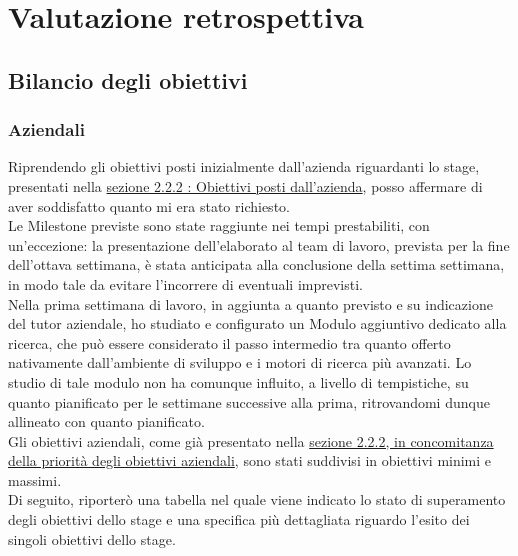 

\chapter{Valutazione retrospettiva}
\label{valutazione_retrospettiva}

\section{Bilancio degli obiettivi}

	\subsection{Aziendali}
	
	Riprendendo gli obiettivi posti inizialmente dall'azienda riguardanti lo stage, presentati nella \hyperref[sub:obiettivi_posti_azienda]{sezione 2.2.2 : Obiettivi posti dall'azienda}, posso affermare di aver soddisfatto quanto mi era stato richiesto. \\
	Le \gls{Milestone} previste sono state raggiunte nei tempi prestabiliti, con un'eccezione: la presentazione dell'elaborato al team di lavoro, prevista per la fine dell'ottava settimana, è stata anticipata alla conclusione della settima settimana, in modo tale da evitare l'incorrere di eventuali imprevisti. \\
	Nella prima settimana di lavoro, in aggiunta a quanto previsto e su indicazione del tutor aziendale, ho studiato e configurato un \gls{Modulo} aggiuntivo dedicato alla ricerca, che può essere considerato il passo intermedio tra quanto offerto nativamente dall'ambiente di sviluppo e i motori di ricerca più avanzati. Lo studio di tale modulo non ha comunque influito, a livello di tempistiche, su quanto pianificato per le settimane successive alla prima, ritrovandomi dunque allineato con quanto pianificato. \\
	Gli obiettivi aziendali, come già presentato nella \hyperref[subsub:priorita_degli_obiettivi_aziendali]{sezione 2.2.2, in concomitanza della priorità degli obiettivi aziendali}, sono stati suddivisi in obiettivi minimi e massimi. \\
	Di seguito, riporterò una tabella nel quale viene indicato lo stato di superamento degli obiettivi dello stage e una specifica più dettagliata riguardo l'esito dei singoli obiettivi dello stage.

